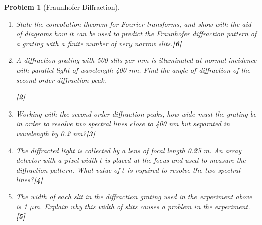 \documentclass[a4paper]{article}
\theoremstyle{new}
\newtheorem{qns}{Problem}[subsection]
\begin{document}
\begin{qns}[Fraunhofer Diffraction]\leavevmode
\begin{enumerate}[label=(\roman*)]
\item State the convolution theorem for Fourier transforms, and show with the aid of diagrams how it can be used to predict the Fraunhofer diffraction pattern of a grating
with a finite number of very narrow slits.\hfill\textbf{[6]}
\item A diffraction grating with 500 slits per mm is illuminated at normal incidence with parallel light of wavelength 400 nm. Find the angle of diffraction of the second-order diffraction peak.

\hfill\textbf{[2]}
\item Working with the second-order diffraction peaks, how wide must the grating be in order to resolve two spectral lines close to 400 nm but separated in wavelength by 0.2 nm?\hfill\textbf{[3]}
\item The diffracted light is collected by a lens of focal length 0.25 m. An array detector with a pixel width $t$ is placed at the focus and used to measure the diffraction pattern. What value of $t$ is required to resolve the two spectral lines?\hfill\textbf{[4]}
\item The width of each slit in the diffraction grating used in the experiment above is 1 $\mu$m. Explain why this width of slits causes a problem in the experiment.\hfill\textbf{[5]}
\end{enumerate}
\end{qns}
\end{document}
